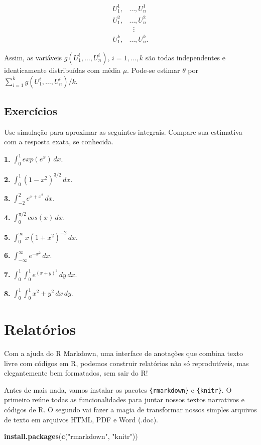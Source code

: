 \documentclass[
]{book}
\newenvironment{Shaded}{\begin{snugshade}}{\end{snugshade}}
\newcommand{\FunctionTok}[1]{\textcolor[rgb]{0.13,0.29,0.53}{\textbf{#1}}}
\newcommand{\NormalTok}[1]{#1}
\newcommand{\StringTok}[1]{\textcolor[rgb]{0.31,0.60,0.02}{#1}}
\begin{document}
\begin{align*}
U_{1}^{1},&\ldots,U_{n}^{1} \\
U_{1}^{2},&\ldots,U_{n}^{2} \\
& \;\;\vdots \\
U_{1}^{k},&\ldots,U_{n}^{k}.
\end{align*}

Assim, as variáveis \(g(U_{1}^{i},\ldots, U_{n}^{i})\), \(i=1,\ldots,k\) são
todas independentes e identicamente distribuídas com média \(\mu\).
Pode-se estimar \(\theta\) por
\(\sum_{i=1}^{k}g(U_{1}^{i},\ldots, U_{n}^{i})/k\).

\section{Exercícios}\label{exercuxedcios-34}

Use simulação para aproximar as seguintes integrais. Compare sua
estimativa com a resposta exata, se conhecida.

\textbf{1.} \(\int_{0}^{1}exp(e^x)\, dx\).

\textbf{2.} \(\int_{0}^{1}(1-x^2)^{3/2}\, dx\).

\textbf{3.} \(\int_{-2}^{2}e^{x+x^2}\, dx\).

\textbf{4.} \(\int_{0}^{\pi/2} cos(x)\, dx\).

\textbf{5.} \(\int_{0}^{\infty}x(1+x^2)^{-2}\, dx\).

\textbf{6.} \(\int_{-\infty}^{\infty}e^{-x^2}\, dx\).

\textbf{7.} \(\int_{0}^{1}\int_{0}^{1}e^{(x+y)^2}\,dy\,dx\).

\textbf{8.} \(\int_0^1 \int_0^1 x^2 + y^2 \, dx \, dy\).

\chapter{Relatórios}\label{relatuxf3rios}

Com a ajuda do R Markdown, uma interface de anotações que combina texto livre com códigos em R, podemos construir relatórios não só reprodutíveis, mas elegantemente bem formatados, sem sair do R!

Antes de mais nada, vamos instalar os pacotes \texttt{\{rmarkdown\}} e \texttt{\{knitr\}}. O primeiro reúne todas as funcionalidades para juntar nossos textos narrativos e códigos de R. O segundo vai fazer a magia de transformar nossos simples arquivos de texto em arquivos HTML, PDF e Word (.doc).

\begin{Shaded}
\begin{Highlighting}[]
\FunctionTok{install.packages}\NormalTok{(}\FunctionTok{c}\NormalTok{(}\StringTok{"rmarkdown"}\NormalTok{, }\StringTok{"knitr"}\NormalTok{))}
\end{Highlighting}
\end{Shaded}
\end{document}
